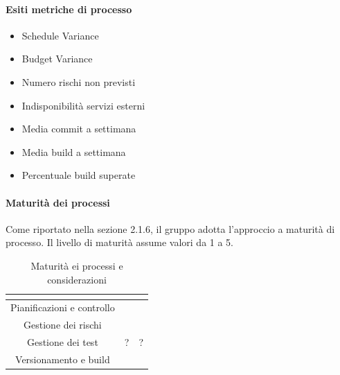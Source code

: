 \paragraph{Esiti metriche di processo} \Spazio
\begin{itemize}
	\item{Schedule Variance}
	\item{Budget Variance}	
	\item{Numero rischi non previsti}
	\item{Indisponibilità servizi esterni}
	\item{Media commit a settimana}
	\item{Media build a settimana}
	\item{Percentuale build superate}
\end{itemize}

\paragraph{Maturità dei processi} \Spazio
Come riportato nella sezione 2.1.6, il gruppo adotta l'approccio a maturità di processo. Il livello di maturità assume valori da 1 a 5.
\renewcommand{\arraystretch}{1.5}
\begin{table}[H]
	\begin{center}
		\begin{tabular}{|c|c|c|}
			\hline
			\rowcolor{title_row}
			\textbf{\color{title_text}{Processo}} & \textbf{\color{title_text}{Livello di maturità}} & \textbf{\color{title_text}{Considerazioni}} \\
			\hline
			{Pianificazioni e controllo} & {} & {}\\	
			\hline
			{Gestione dei rischi} & {} & {}\\	
			\hline
			{Gestione dei test} & {?} & {?}\\	
			\hline
			{Versionamento e build} & {} & {}\\	
			\hline
			
		\end{tabular}
		\caption[Maturità dei processi, Analisi]{Maturità ei processi e considerazioni}	
		\label{tabella: considerazioni sulla maturità dei processi raggiunta}
	\end{center}
\end{table}


\renewcommand{\arraystretch}{1}
